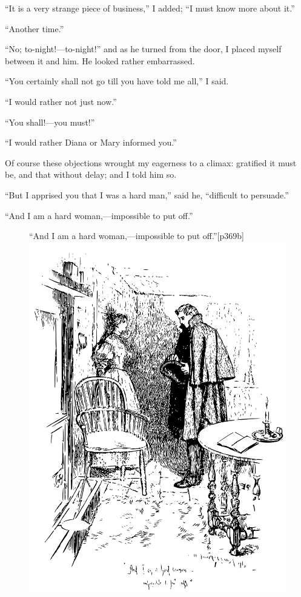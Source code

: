 \enquote{It is a very strange piece of business,} I added; \enquote{I
must know more about it.}

\enquote{Another time.}

\enquote{No; to-night!---to-night!} and as he turned from the door, I
placed myself between it and him. He looked rather embarrassed.

\enquote{You certainly shall not go till you have told me all,} I said.

\enquote{I would rather not just now.}

\enquote{You shall!---you must!}

\enquote{I would rather Diana or Mary informed you.}

Of course these objections wrought my eagerness to a climax: gratified
it must be, and that without delay; and I told him so.

\enquote{But I apprised you that I was a hard man,} said he,
\enquote{difficult to persuade.}

\enquote{And I am a hard woman,---impossible to put off.}

\begin{figure}
	\begin{sidecaption}{\enquote{And I am a hard woman,\linebreak---impossible to put off.}}[p369b]
		\centering
		\includegraphics[width=\linewidth]{images/p369b.pdf}
	\end{sidecaption}
\end{figure}

